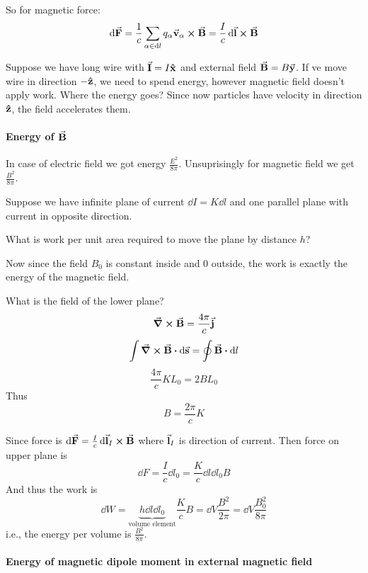 So for magnetic force:
$$\dd{\va{F}} = \frac{1}{c} \sum_{\alpha \in \dd{l}} q_\alpha \va{v}_\alpha \cross \va{B} = \frac{I}{c} \dd{\va{l}} \cross \va{B}$$

Suppose we have long wire with $\va{I} = I\vu{x}$ and external field $\va{B} = B\va{y}$. If ve move wire in direction $-\vu{z}$, we need to spend energy, however magnetic field doesn't apply work. Where the energy goes? Since now particles have velocity in direction $\vu{z}$, the field accelerates them.

\paragraph{Energy of $\va{B}$}
In case of electric field we got energy $\frac{E^2}{8\pi}$. Unsuprisingly for magnetic field we get $\frac{B^2}{8\pi}$.

Suppose we have infinite plane of current $\dd{I} = K \dd{l}$ and one parallel plane with current in opposite direction.

What is work per unit area required to move the plane by distance $h$?

Now since the field $B_0$ is constant inside and 0 outside, the work is exactly the energy of the magnetic field.

What is the field of the lower plane?
$$\curl{\va{B}} = \frac{4\pi}{c} \va{j}$$
$$\int \curl{\va{B}} \vdot \dd{\va{s}} = \oint \va{B} \vdot \dd{l}$$
$$\frac{4\pi}{c} KL_0 = 2BL_0$$
Thus
$$B = \frac{2\pi}{c} K$$

Since force is $\dd{\va{F}} =\frac{I}{c} \dd{\va{l}_I} \cross \va{B}$
where $\va{l}_I$ is direction of current. Then force on upper plane is
$$\dd{F} = \frac{I}{c}\dd{l_0}  = \frac{K}{c}\dd{l}\dd{l_0} B $$
And thus the work is
$$\dd{W} = \underbrace{h\dd{l}\dd{l_0}}_{\text{volume element}} \frac{K}{c}B = \dd{V} \frac{B^2}{2\pi} =  \dd{V} \frac{B^2_0}{8\pi}  $$
i.e., the energy per volume is $\frac{B^2}{8\pi}$.

\paragraph{Energy of magnetic dipole moment in external magnetic field}
